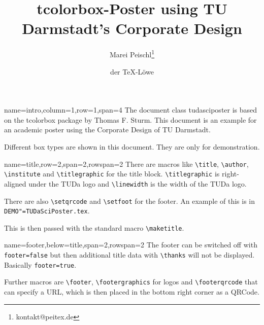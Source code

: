 \documentclass[
	english,%
	accentcolor=9c,%
]{tudasciposter}
\newcommand*{\file}[1]{\texttt{#1}}
\newcommand*{\code}[1]{\texttt{#1}}
\newcommand*{\pkg}[1]{\textsf{#1}}
\newcommand*{\cls}[1]{\textsf{#1}}
\newcommand{\tbs}{\textbackslash}
\newcommand*{\macro}[1]{\code{\tbs#1}}
\begin{document}
\title{\pkg{tcolorbox}-Poster using TU Darmstadt's Corporate Design}
\author{Marei Peischl\inst{*}\thanks{kontakt@peitex.de} \and der \TeX-Löwe}


\begin{tcbposter}[
	poster={
		columns=4,
		rows=7,
		spacing=1cm,
	},]

\begin{posterboxenv}[title=Intro]{name=intro,column=1,row=1,span=4}
	The document class \cls{tudasciposter} is based on the \pkg{tcolorbox} package by Thomas F. Sturm.
	This document is an example for an academic poster using the Corporate Design of TU Darmstadt.

	Different box types are shown in this document. They are only for demonstration.
\end{posterboxenv}

\begin{posterboxenv}[title=Title]{name=title,row=2,span=2,rowspan=2}
	There are macros like \macro{title}, \macro{author}, \macro{institute} and \macro{titlegraphic} for the title block.
	\macro{titlegraphic} is right-aligned under the TUDa logo and
	\macro{linewidth} is the width of the TUDa logo.

	There are also \macro{setqrcode} and \macro{setfoot} for the footer. An example of this is in \file{DEMO"=TUDaSciPoster.tex}.

	This is then passed with the standard macro \macro{maketitle}.
\end{posterboxenv}

\begin{posterboxenv}[title=Footer]{name=footer,below=title,span=2,rowspan=2}
	The footer can be switched off with \code{footer=false} but then additional title data with \macro{thanks} will not be displayed. Basically \code{footer=true}.

	Further macros are \macro{footer}, \macro{footergraphics} for logos and \macro{footerqrcode} that can specify a URL, which is then placed in the bottom right corner as a QRCode.


\end{posterboxenv}
\end{tcbposter}
\end{document}

